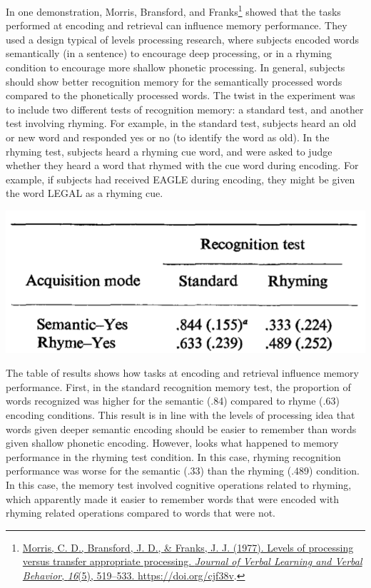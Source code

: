 \documentclass[
  oneside,
  12pt]{crumpbook}
\newenvironment{floatright50}{%
  \wrapfigure{R}{.5\textwidth}%
  }{%
  \endwrapfigure}
\begin{document}
In one demonstration, Morris, Bransford, and Franks\footnote{\protect\hyperlink{ref-morrisLevelsProcessingTransfer1977}{Morris, C. D., Bransford, J. D., \& Franks, J. J. (1977). Levels of processing versus transfer appropriate processing. \emph{Journal of Verbal Learning and Verbal Behavior}, \emph{16}(5), 519--533. \url{https://doi.org/cjf38v}}.} showed that the tasks performed at encoding and retrieval can influence memory performance. They used a design typical of levels processing research, where subjects encoded words semantically (in a sentence) to encourage deep processing, or in a rhyming condition to encourage more shallow phonetic processing. In general, subjects should show better recognition memory for the semantically processed words compared to the phonetically processed words. The twist in the experiment was to include two different tests of recognition memory: a standard test, and another test involving rhyming. For example, in the standard test, subjects heard an old or new word and responded yes or no (to identify the word as old). In the rhyming test, subjects heard a rhyming cue word, and were asked to judge whether they heard a word that rhymed with the cue word during encoding. For example, if subjects had received EAGLE during encoding, they might be given the word LEGAL as a rhyming cue.

\begin{floatright50}
\includegraphics[width=1\linewidth]{imgs/Tip_Tap}

\end{floatright50}

The table of results shows how tasks at encoding and retrieval influence memory performance. First, in the standard recognition memory test, the proportion of words recognized was higher for the semantic (.84) compared to rhyme (.63) encoding conditions. This result is in line with the levels of processing idea that words given deeper semantic encoding should be easier to remember than words given shallow phonetic encoding. However, looks what happened to memory performance in the rhyming test condition. In this case, rhyming recognition performance was worse for the semantic (.33) than the rhyming (.489) condition. In this case, the memory test involved cognitive operations related to rhyming, which apparently made it easier to remember words that were encoded with rhyming related operations compared to words that were not.
\end{document}
